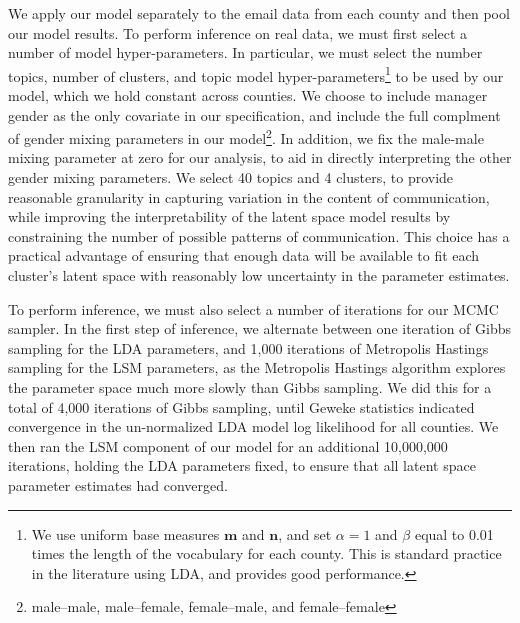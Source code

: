\documentclass{pnastwo}
\begin{document}
\begin{article}
We apply our model separately to the email data from each county and then pool our model results. To perform inference on real data, we must first select a number of model hyper-parameters. In particular, we must select the number topics, number of clusters, and topic model hyper-parameters\footnote{We use uniform base measures $\mathbf{m}$ and $\mathbf{n}$, and set $\alpha = 1$ and $\beta$ equal to 0.01 times the length of the vocabulary for each county. This is standard practice in the literature using LDA, and provides good performance.} to be used by our model, which we hold constant across counties. We choose to include manager gender as the only covariate in our specification, and include the full complment of gender mixing parameters in our model\footnote{male--male, male--female, female--male, and female--female}. In addition, we fix the male-male mixing parameter at zero for our analysis, to aid in directly interpreting the other gender mixing parameters. We select 40 topics and 4 clusters, to provide reasonable granularity in capturing variation in the content of communication, while improving the interpretability of the latent space model results by constraining the number of possible patterns of communication. This choice has a practical advantage of ensuring that enough data will be available to fit each cluster’s latent space with reasonably low uncertainty in the parameter estimates.

To perform inference, we must also select a number of iterations for our MCMC sampler. In the first step of inference, we alternate between one iteration of Gibbs sampling for the LDA parameters, and 1,000 iterations of Metropolis Hastings sampling for the LSM parameters, as the Metropolis Hastings algorithm explores the parameter space much more slowly than Gibbs sampling. We did this for a total of 4,000 iterations of Gibbs sampling, until Geweke statistics indicated convergence in the un-normalized LDA model log likelihood for all counties. We then ran the LSM component of our model for an additional 10,000,000 iterations, holding the LDA parameters fixed, to ensure that all latent space parameter estimates had converged.



\end{article}
\end{document}
